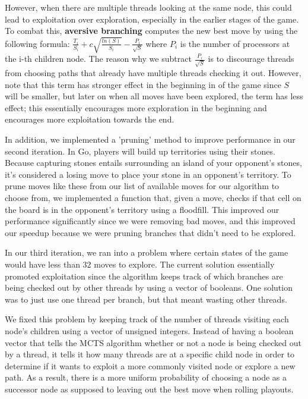 \documentclass[11pt]{article}
\begin{document}
However, when there are multiple threads looking at the same node, this could lead to exploitation over exploration, especially in the earlier stages of the game. To combat this, \textbf{aversive branching} computes the new best move by using the following formula: $\frac{T_i}{S_i} + c\sqrt{\frac{ln(S)}{S_i}} - \frac{P_i}{\sqrt{S}}$ where $P_i$ is the number of processors at the i-th children node. The reason why we subtract $\frac{P_i}{\sqrt{S}}$ is to discourage threads from choosing paths that already have multiple threads checking it out. However, note that this term has stronger effect in the beginning in of the game since $S$ will be smaller, but later on when all moves have been explored, the term has less effect; this essentially encourages more exploration in the beginning and encourages more exploitation towards the end. 

In addition, we implemented a 'pruning' method to improve performance in our second iteration. In Go, players will build up territories using their stones. Because capturing stones entails surrounding an island of your opponent's stones, it's considered a losing move to place your stone in an opponent's territory. To prune moves like these from our list of available moves for our algorithm to choose from, we implemented a function that, given a move, checks if that cell on the board is in the opponent's territory using a floodfill. This improved our performance significantly since we were removing bad moves, and this improved our speedup because we were pruning branches that didn't need to be explored. 

In our third iteration, we ran into a problem where certain states of the game would have less than 32 moves to explore. The current solution essentially promoted exploitation since the algorithm keeps track of which branches are being checked out by other threads by using a vector of booleans. One solution was to just use one thread per branch, but that meant wasting other threads.

We fixed this problem by keeping track of the number of threads visiting each node's children using a vector of unsigned integers. Instead of having a boolean vector that tells the MCTS algorithm whether or not a node is being checked out by a thread, it tells it how many threads are at a specific child node in order to determine if it wants to exploit a more commonly visited node or explore a new path. As a result, there is a more uniform probability of choosing a node as a successor node as supposed to leaving out the best move when rolling playouts. 
\end{document}
